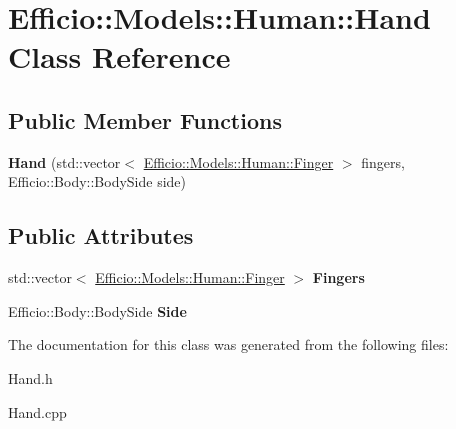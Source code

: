 \hypertarget{class_efficio_1_1_models_1_1_human_1_1_hand}{}\section{Efficio\+:\+:Models\+:\+:Human\+:\+:Hand Class Reference}
\label{class_efficio_1_1_models_1_1_human_1_1_hand}
\subsection*{Public Member Functions}
\begin{DoxyCompactItemize}
\item 
{\bfseries Hand} (std\+::vector$<$ \hyperlink{class_efficio_1_1_models_1_1_human_1_1_finger}{Efficio\+::\+Models\+::\+Human\+::\+Finger} $>$ fingers, Efficio\+::\+Body\+::\+Body\+Side side)\hypertarget{class_efficio_1_1_models_1_1_human_1_1_hand_a8917e801859dd364f255bbd38fa16762}{}\label{class_efficio_1_1_models_1_1_human_1_1_hand_a8917e801859dd364f255bbd38fa16762}

\end{DoxyCompactItemize}
\subsection*{Public Attributes}
\begin{DoxyCompactItemize}
\item 
std\+::vector$<$ \hyperlink{class_efficio_1_1_models_1_1_human_1_1_finger}{Efficio\+::\+Models\+::\+Human\+::\+Finger} $>$ {\bfseries Fingers}\hypertarget{class_efficio_1_1_models_1_1_human_1_1_hand_a96e7221f2a760f9c15a7ac935b538493}{}\label{class_efficio_1_1_models_1_1_human_1_1_hand_a96e7221f2a760f9c15a7ac935b538493}

\item 
Efficio\+::\+Body\+::\+Body\+Side {\bfseries Side}\hypertarget{class_efficio_1_1_models_1_1_human_1_1_hand_a9ead927dffc76db7a048cde9d3978c4d}{}\label{class_efficio_1_1_models_1_1_human_1_1_hand_a9ead927dffc76db7a048cde9d3978c4d}

\end{DoxyCompactItemize}


The documentation for this class was generated from the following files\+:\begin{DoxyCompactItemize}
\item 
Hand.\+h\item 
Hand.\+cpp\end{DoxyCompactItemize}
